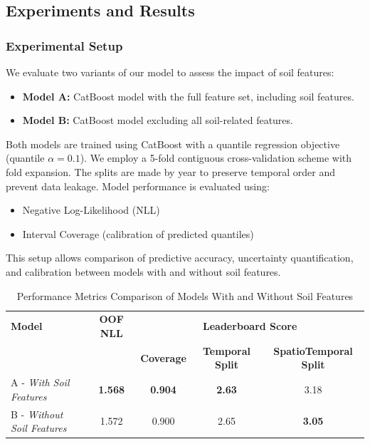 \documentclass[ruler]{CUP-JNL-EDS}%
\begin{document}
\subsection{Experiments and Results}
\subsubsection{Experimental Setup}
We evaluate two variants of our model to assess the impact of soil features:
\begin{itemize}
    \item \textbf{Model A:} CatBoost model with the full feature set, including soil features.
    \item \textbf{Model B:} CatBoost model excluding all soil-related features.
\end{itemize}

Both models are trained using CatBoost with a quantile regression objective (quantile $\alpha=0.1$).
We employ a 5-fold contiguous cross-validation scheme with fold expansion. The splits are made by year to 
preserve temporal order and prevent data leakage. Model performance is evaluated using:
\begin{itemize}
    \item Negative Log-Likelihood (NLL)
    \item Interval Coverage (calibration of predicted quantiles)
\end{itemize}

\noindent This setup allows comparison of predictive accuracy, uncertainty quantification, and calibration 
between models with and without soil features.

\begin{table}[htbp]
\centering
\label{tab:metrics_comparison}
\begin{tabular}{lcccc}
\hline
\textbf{Model} & \textbf{OOF NLL} & \multicolumn{3}{c}{\textbf{Leaderboard Score}} \\
\cline{3-5}
 & & \textbf{Coverage} & \textbf{Temporal Split} & \textbf{SpatioTemporal Split} \\
\hline
A - \textit{With Soil Features} & \textbf{1.568} & \textbf{0.904} & \textbf{2.63} & 3.18 \\
B - \textit{Without Soil Features} & 1.572 & 0.900 & 2.65 & \textbf{3.05} \\
\end{tabular}
\caption{Performance Metrics Comparison of Models With and Without Soil Features}
\end{table}
\end{document}
